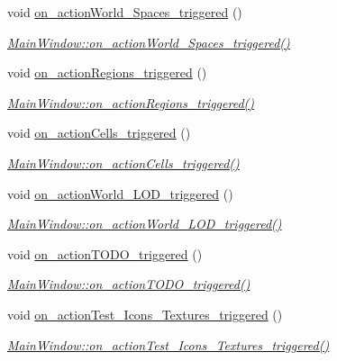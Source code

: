 \begin{DoxyCompactItemize}
void \hyperlink{class_main_window_a8e0b3c4ebbe0e6a744500f32e7b343f9}{on\+\_\+action\+World\+\_\+\+Spaces\+\_\+triggered} ()
\begin{DoxyCompactList}\small\item\em \hyperlink{class_main_window_a8e0b3c4ebbe0e6a744500f32e7b343f9}{Main\+Window\+::on\+\_\+action\+World\+\_\+\+Spaces\+\_\+triggered()} \end{DoxyCompactList}\item 
void \hyperlink{class_main_window_a4eae54da532473a41d4047cddca1adba}{on\+\_\+action\+Regions\+\_\+triggered} ()
\begin{DoxyCompactList}\small\item\em \hyperlink{class_main_window_a4eae54da532473a41d4047cddca1adba}{Main\+Window\+::on\+\_\+action\+Regions\+\_\+triggered()} \end{DoxyCompactList}\item 
void \hyperlink{class_main_window_abe162b3673599552213251a049a93eac}{on\+\_\+action\+Cells\+\_\+triggered} ()
\begin{DoxyCompactList}\small\item\em \hyperlink{class_main_window_abe162b3673599552213251a049a93eac}{Main\+Window\+::on\+\_\+action\+Cells\+\_\+triggered()} \end{DoxyCompactList}\item 
void \hyperlink{class_main_window_ac8f6bda78b3a005a294a7a1304acd1ec}{on\+\_\+action\+World\+\_\+\+L\+O\+D\+\_\+triggered} ()
\begin{DoxyCompactList}\small\item\em \hyperlink{class_main_window_ac8f6bda78b3a005a294a7a1304acd1ec}{Main\+Window\+::on\+\_\+action\+World\+\_\+\+L\+O\+D\+\_\+triggered()} \end{DoxyCompactList}\item 
void \hyperlink{class_main_window_ad66df2de0ccf574f449f5e7258bcdfba}{on\+\_\+action\+T\+O\+D\+O\+\_\+triggered} ()
\begin{DoxyCompactList}\small\item\em \hyperlink{class_main_window_ad66df2de0ccf574f449f5e7258bcdfba}{Main\+Window\+::on\+\_\+action\+T\+O\+D\+O\+\_\+triggered()} \end{DoxyCompactList}\item 
void \hyperlink{class_main_window_a772b1c26a74f70f9ecbe3348926cdd2c}{on\+\_\+action\+Test\+\_\+\+Icons\+\_\+\+Textures\+\_\+triggered} ()
\begin{DoxyCompactList}\small\item\em \hyperlink{class_main_window_a772b1c26a74f70f9ecbe3348926cdd2c}{Main\+Window\+::on\+\_\+action\+Test\+\_\+\+Icons\+\_\+\+Textures\+\_\+triggered()} \end{DoxyCompactList}\item 

\end{DoxyCompactItemize}

